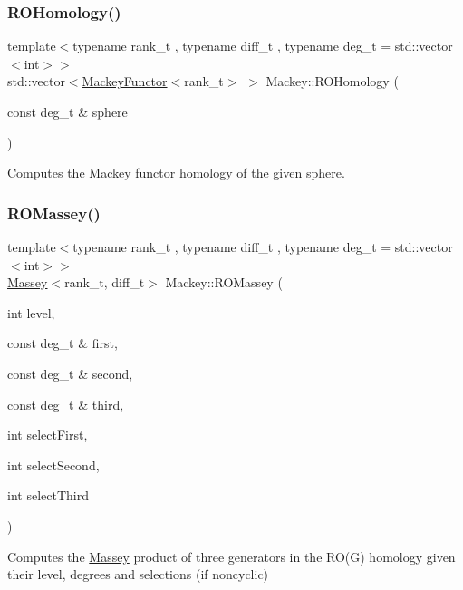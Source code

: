 \subsubsection{\texorpdfstring{R\+O\+Homology()}{ROHomology()}}
{\footnotesize\ttfamily template$<$typename rank\+\_\+t , typename diff\+\_\+t , typename deg\+\_\+t  = std\+::vector$<$int$>$$>$ \\
std\+::vector$<$\hyperlink{classMackey_1_1MackeyFunctor}{Mackey\+Functor}$<$rank\+\_\+t$>$ $>$ Mackey\+::\+R\+O\+Homology (\begin{DoxyParamCaption}\item[{const deg\+\_\+t \&}]{sphere }\end{DoxyParamCaption})}



Computes the \hyperlink{namespaceMackey}{Mackey} functor homology of the given sphere. 

\mbox{\label{namespaceMackey_ab75d7bcfa2d92d01bea0d5eef9f48398}} 
\subsubsection{\texorpdfstring{R\+O\+Massey()}{ROMassey()}\hspace{0.1cm}{\footnotesize\ttfamily [1/2]}}
{\footnotesize\ttfamily template$<$typename rank\+\_\+t , typename diff\+\_\+t , typename deg\+\_\+t  = std\+::vector$<$int$>$$>$ \\
\hyperlink{classMackey_1_1Massey}{Massey}$<$rank\+\_\+t, diff\+\_\+t$>$ Mackey\+::\+R\+O\+Massey (\begin{DoxyParamCaption}\item[{int}]{level,  }\item[{const deg\+\_\+t \&}]{first,  }\item[{const deg\+\_\+t \&}]{second,  }\item[{const deg\+\_\+t \&}]{third,  }\item[{int}]{select\+First,  }\item[{int}]{select\+Second,  }\item[{int}]{select\+Third }\end{DoxyParamCaption})}



Computes the \hyperlink{classMackey_1_1Massey}{Massey} product of three generators in the R\+O(\+G) homology given their level, degrees and selections (if noncyclic) 

